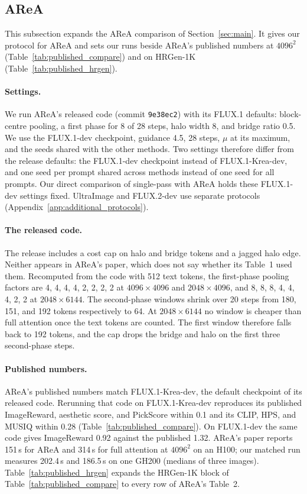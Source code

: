 \subsection{AReA}
\label{app:area}

This subsection expands the AReA comparison of Section~\ref{sec:main}. It gives our protocol for AReA and sets our runs beside AReA's published numbers at $4096^2$ (Table~\ref{tab:published_compare}) and on HRGen-1K (Table~\ref{tab:published_hrgen}).

\paragraph{Settings.} We run AReA's released code (commit \texttt{9e38ec2}) with its FLUX.1 defaults: block-centre pooling, a first phase for 8 of 28 steps, halo width 8, and bridge ratio 0.5. We use the FLUX.1-dev checkpoint, guidance 4.5, 28 steps, $\mu$ at its maximum, and the seeds shared with the other methods. Two settings therefore differ from the release defaults: the FLUX.1-dev checkpoint instead of FLUX.1-Krea-dev, and one seed per prompt shared across methods instead of one seed for all prompts. Our direct comparison of single-pass \sca{} with AReA holds these FLUX.1-dev settings fixed. UltraImage and FLUX.2-dev use separate protocols (Appendix~\ref{app:additional_protocols}).

\paragraph{The released code.} The release includes a cost cap on halo and bridge tokens and a jagged halo edge. Neither appears in AReA's paper, which does not say whether its Table~1 used them. Recomputed from the code with 512 text tokens, the first-phase pooling factors are 4, 4, 4, 4, 2, 2, 2, 2 at $4096\times4096$ and $2048\times4096$, and 8, 8, 8, 4, 4, 4, 2, 2 at $2048\times6144$. The second-phase windows shrink over 20 steps from 180, 151, and 192 tokens respectively to 64. At $2048\times6144$ no window is cheaper than full attention once the text tokens are counted. The first window therefore falls back to 192 tokens, and the cap drops the bridge and halo on the first three second-phase steps.

\paragraph{Published numbers.} AReA's published numbers match FLUX.1-Krea-dev, the default checkpoint of its released code. Rerunning that code on FLUX.1-Krea-dev reproduces its published ImageReward, aesthetic score, and PickScore within 0.1 and its CLIP, HPS, and MUSIQ within 0.28 (Table~\ref{tab:published_compare}). On FLUX.1-dev the same code gives ImageReward 0.92 against the published 1.32. AReA's paper reports 151\,s for AReA and 314\,s for full attention at $4096^2$ on an H100; our matched run measures 202.4\,s and 186.5\,s on one GH200 (medians of three images). Table~\ref{tab:published_hrgen} expands the HRGen-1K block of Table~\ref{tab:published_compare} to every row of AReA's Table~2.

